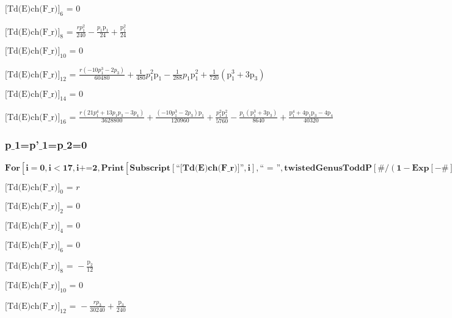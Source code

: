 \documentclass{article}
\newcommand{\unicode}[1]{{}}
\begin{document}
\noindent\(\text{[Td(E)ch(F$\_$r)]}_6\text{ = }0\)

\noindent\(\text{[Td(E)ch(F$\_$r)]}_8\text{ = }\frac{r p_1^2}{240}-\frac{p_1 \text{p$\unicode{02bc}$}_1}{24}+\frac{\text{p$\unicode{02bc}$}_1^2}{24}\)

\noindent\(\text{[Td(E)ch(F$\_$r)]}_{10}\text{ = }0\)

\noindent\(\text{[Td(E)ch(F$\_$r)]}_{12}\text{ = }\frac{r \left(-10 p_1^3-2 p_3\right)}{60480}+\frac{1}{480} p_1^2 \text{p$\unicode{02bc}$}_1-\frac{1}{288}
p_1 \text{p$\unicode{02bc}$}_1^2+\frac{1}{720} \left(\text{p$\unicode{02bc}$}_1^3+3 \text{p$\unicode{02bc}$}_3\right)\)

\noindent\(\text{[Td(E)ch(F$\_$r)]}_{14}\text{ = }0\)

\noindent\(\text{[Td(E)ch(F$\_$r)]}_{16}\text{ = }\frac{r \left(21 p_1^4+13 p_1 p_3-3 p_4\right)}{3628800}+\frac{\left(-10 p_1^3-2 p_3\right) \text{p$\unicode{02bc}$}_1}{120960}+\frac{p_1^2
\text{p$\unicode{02bc}$}_1^2}{5760}-\frac{p_1 \left(\text{p$\unicode{02bc}$}_1^3+3 \text{p$\unicode{02bc}$}_3\right)}{8640}+\frac{\text{p$\unicode{02bc}$}_1^4+4
\text{p$\unicode{02bc}$}_1 \text{p$\unicode{02bc}$}_3-4 \text{p$\unicode{02bc}$}_4}{40320}\)

\subsubsection*{p$\_$1=p{'}$\_$1=p$\_$2=0}

\begin{doublespace}
\noindent\(\pmb{\text{For}\left[i=0,i<17,i\text{+=}2, \text{Print}\left[\text{Subscript}[\text{{``}[Td(E)ch(F$\_$r)]{''}},i],\text{{``} = {''}},\text{twistedGenusToddP}[\#/(1-\text{Exp}[-\#])\&,i]\text{/.}p_1\to
0\text{/.}\text{p$\unicode{02bc}$}_1\to 0\text{/.}p_2\to 0\right]\right]}\)
\end{doublespace}

\noindent\(\text{[Td(E)ch(F$\_$r)]}_0\text{ = }r\)

\noindent\(\text{[Td(E)ch(F$\_$r)]}_2\text{ = }0\)

\noindent\(\text{[Td(E)ch(F$\_$r)]}_4\text{ = }0\)

\noindent\(\text{[Td(E)ch(F$\_$r)]}_6\text{ = }0\)

\noindent\(\text{[Td(E)ch(F$\_$r)]}_8\text{ = }-\frac{\text{p$\unicode{02bc}$}_2}{12}\)

\noindent\(\text{[Td(E)ch(F$\_$r)]}_{10}\text{ = }0\)

\noindent\(\text{[Td(E)ch(F$\_$r)]}_{12}\text{ = }-\frac{r p_3}{30240}+\frac{\text{p$\unicode{02bc}$}_3}{240}\)
\end{document}

